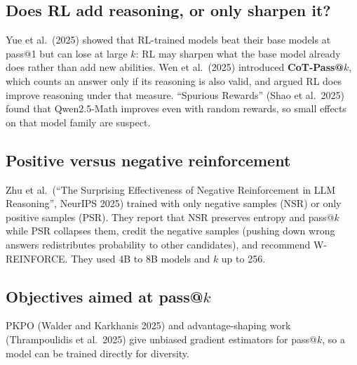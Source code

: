 \documentclass[11pt]{article}
\begin{document}
\subsection{Does RL add reasoning, or only sharpen it?}
Yue et al.\ (2025) showed that RL-trained models beat their base models at pass@1 but can lose at large $k$: RL may sharpen what the base model already does rather than add new abilities. Wen et al.\ (2025) introduced \textbf{CoT-Pass@$k$}, which counts an answer only if its reasoning is also valid, and argued RL does improve reasoning under that measure. ``Spurious Rewards'' (Shao et al.\ 2025) found that Qwen2.5-Math improves even with random rewards, so small effects on that model family are suspect.

\subsection{Positive versus negative reinforcement}
Zhu et al.\ (``The Surprising Effectiveness of Negative Reinforcement in LLM Reasoning'', NeurIPS 2025) trained with only negative samples (NSR) or only positive samples (PSR). They report that NSR preserves entropy and pass@$k$ while PSR collapses them, credit the negative samples (pushing down wrong answers redistributes probability to other candidates), and recommend W-REINFORCE. They used 4B to 8B models and $k$ up to 256.

\subsection{Objectives aimed at pass@\texorpdfstring{$k$}{k}}
PKPO (Walder and Karkhanis 2025) and advantage-shaping work (Thrampoulidis et al.\ 2025) give unbiased gradient estimators for pass@$k$, so a model can be trained directly for diversity.
\end{document}
